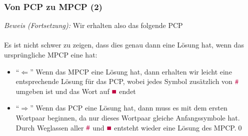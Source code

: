 \documentclass[aspectratio=1610,onlymath]{beamer}
\begin{document}
\begin{frame}[t]\frametitle{Von PCP zu MPCP (2)}

% 

\emph{Beweis (Fortsetzung):} Wir erhalten also das folgende PCP\\[1ex]
\\[1ex]
%
Es ist nicht schwer zu zeigen, dass dies genau dann eine Lösung hat, wenn das ursprüngliche MPCP eine hat:\pause
\begin{itemize}
\item "`$\Leftarrow$"' Wenn das MPCP eine Lösung hat, dann erhalten wir leicht eine entsprechende Lösung für das PCP, wobei jedes Symbol zusätzlich von $\mathtt{\textcolor{purple}{\#}}$ umgeben ist und das Wort auf $\mathtt{\textcolor{purple}{\blacksquare}}$ endet\pause
\item "`$\Rightarrow$"' Wenn das PCP eine Lösung hat, dann muss es mit dem ersten Wortpaar beginnen, da nur dieses Wortpaar gleiche Anfangssymbole hat. Durch Weglassen aller $\mathtt{\textcolor{purple}{\#}}$ und 
$\mathtt{\textcolor{purple}{\blacksquare}}$ entsteht wieder eine Lösung des MPCP.\qed
\end{itemize}

\end{frame}
\end{document}
